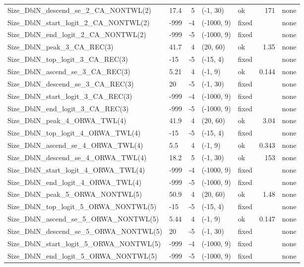 \documentclass[
]{scrartcl}
\begin{document}
\begin{landscape}
\begin{longtable}{llrllrl}
Size\_DblN\_descend\_se\_2\_CA\_NONTWL(2) & 17.4 & 5 & (-1, 30) & ok & 171 & none \\ 
Size\_DblN\_start\_logit\_2\_CA\_NONTWL(2) & -999 & -4 & (-1000, 9) & fixed &  & none \\ 
Size\_DblN\_end\_logit\_2\_CA\_NONTWL(2) & -999 & -5 & (-1000, 9) & fixed &  & none \\ 
Size\_DblN\_peak\_3\_CA\_REC(3) & 41.7 & 4 & (20, 60) & ok & 1.35 & none \\ 
Size\_DblN\_top\_logit\_3\_CA\_REC(3) & -15 & -5 & (-15, 4) & fixed &  & none \\ 
Size\_DblN\_ascend\_se\_3\_CA\_REC(3) & 5.21 & 4 & (-1, 9) & ok & 0.144 & none \\ 
Size\_DblN\_descend\_se\_3\_CA\_REC(3) & 20 & -5 & (-1, 30) & fixed &  & none \\ 
Size\_DblN\_start\_logit\_3\_CA\_REC(3) & -999 & -4 & (-1000, 9) & fixed &  & none \\ 
Size\_DblN\_end\_logit\_3\_CA\_REC(3) & -999 & -5 & (-1000, 9) & fixed &  & none \\ 
Size\_DblN\_peak\_4\_ORWA\_TWL(4) & 41.9 & 4 & (20, 60) & ok & 3.04 & none \\ 
Size\_DblN\_top\_logit\_4\_ORWA\_TWL(4) & -15 & -5 & (-15, 4) & fixed &  & none \\ 
Size\_DblN\_ascend\_se\_4\_ORWA\_TWL(4) & 5.5 & 4 & (-1, 9) & ok & 0.343 & none \\ 
Size\_DblN\_descend\_se\_4\_ORWA\_TWL(4) & 18.2 & 5 & (-1, 30) & ok & 153 & none \\ 
Size\_DblN\_start\_logit\_4\_ORWA\_TWL(4) & -999 & -4 & (-1000, 9) & fixed &  & none \\ 
Size\_DblN\_end\_logit\_4\_ORWA\_TWL(4) & -999 & -5 & (-1000, 9) & fixed &  & none \\ 
Size\_DblN\_peak\_5\_ORWA\_NONTWL(5) & 50.9 & 4 & (20, 60) & ok & 1.48 & none \\ 
Size\_DblN\_top\_logit\_5\_ORWA\_NONTWL(5) & -15 & -5 & (-15, 4) & fixed &  & none \\ 
Size\_DblN\_ascend\_se\_5\_ORWA\_NONTWL(5) & 5.44 & 4 & (-1, 9) & ok & 0.147 & none \\ 
Size\_DblN\_descend\_se\_5\_ORWA\_NONTWL(5) & 20 & -5 & (-1, 30) & fixed &  & none \\ 
Size\_DblN\_start\_logit\_5\_ORWA\_NONTWL(5) & -999 & -4 & (-1000, 9) & fixed &  & none \\ 
Size\_DblN\_end\_logit\_5\_ORWA\_NONTWL(5) & -999 & -5 & (-1000, 9) & fixed &  & none \\ 

\end{longtable}
\end{landscape}
\end{document}
